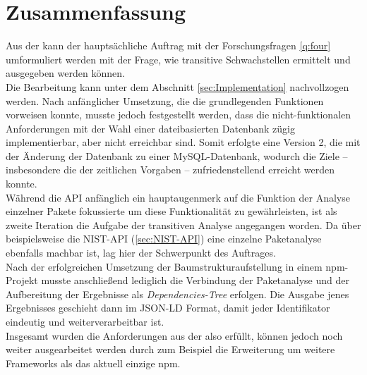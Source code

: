 \section{Zusammenfassung} \label{sec:Zusammenfassung}
    Aus der  kann der hauptsächliche Auftrag mit der Forschungsfragen \ref{q:four} umformuliert werden mit der Frage, wie transitive Schwachstellen ermittelt und ausgegeben werden können.
    \\
    Die Bearbeitung kann unter dem Abschnitt \ref{sec:Implementation}  nachvollzogen werden.
    Nach anfänglicher Umsetzung, die die grundlegenden Funktionen vorweisen konnte, musste jedoch festgestellt werden, dass die nicht-funktionalen Anforderungen mit der Wahl einer dateibasierten Datenbank zügig implementierbar, aber nicht erreichbar sind.
    Somit erfolgte eine Version 2, die mit der Änderung der Datenbank zu einer MySQL-Datenbank, wodurch die Ziele -- insbesondere die der zeitlichen Vorgaben -- zufriedenstellend erreicht werden konnte.
    \\
    Während die \ac{API} anfänglich ein hauptaugenmerk auf die Funktion der Analyse einzelner Pakete fokussierte um diese Funktionalität zu gewährleisten, ist als zweite Iteration die Aufgabe der transitiven Analyse angegangen worden.
    Da über beispielsweise die NIST-API (\ref{sec:NIST-API}) eine einzelne Paketanalyse ebenfalls machbar ist, lag hier der Schwerpunkt des Auftrages.
    \\
    Nach der erfolgreichen Umsetzung der Baumstrukturaufstellung in einem npm-Projekt musste anschließend lediglich die Verbindung der Paketanalyse und der Aufbereitung der Ergebnisse als \textit{Dep\-en\-dencies-Tree} erfolgen.
    Die Ausgabe jenes Ergebnisses geschieht dann im \ac{JSON-LD} Format, damit jeder Identifikator eindeutig und weiterverarbeitbar ist.
    \\
    Insgesamt wurden die Anforderungen aus der  also erfüllt, können jedoch noch weiter ausgearbeitet werden durch zum Beispiel die Erweiterung um weitere Frameworks als das aktuell einzige npm.
